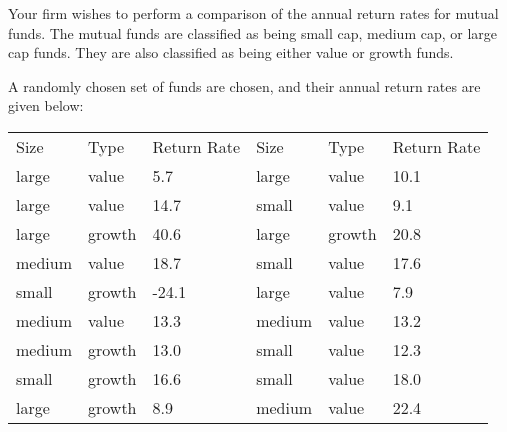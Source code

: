 Your firm wishes to perform a comparison of the annual return rates
for mutual funds. The mutual funds are classified as being small cap,
medium cap, or large cap funds. They are also classified as being
either value or growth funds.

A randomly chosen set of funds are chosen, and their annual return
rates are given below: \\
\begin{tabular}{lll@{\hspace{4em}}lll}
Size   & Type   & Return Rate & Size & Type & Return Rate  \\
large  & value  & 5.7   & large  & value  & 10.1 \\ 
large  & value  & 14.7  & small  & value  & 9.1 \\
large  & growth & 40.6  & large  & growth & 20.8 \\
medium & value  & 18.7  & small  & value  & 17.6 \\
small  & growth & -24.1 & large  & value  & 7.9 \\
medium & value  & 13.3  & medium & value  & 13.2 \\
medium & growth & 13.0  & small  & value  & 12.3 \\
small  & growth & 16.6  & small  & value  & 18.0 \\
large  & growth & 8.9   & medium & value  & 22.4
\end{tabular}

